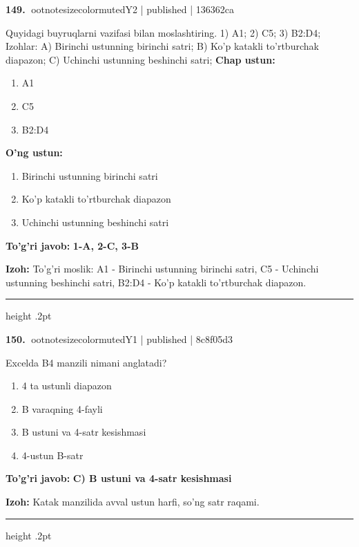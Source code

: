 \documentclass[10pt,a4paper]{article}
\begin{document}
\textbf{\color{ink}149.} {ootnotesizecolor{muted}Y2 | published | 136362ca}
\par
Quyidagi buyruqlarni vazifasi bilan moslashtiring.  1) A1;  2) C5;  3) B2:D4;  Izohlar: A) Birinchi ustunning birinchi satri;  B) Ko'p katakli to'rtburchak diapazon;  C) Uchinchi ustunning beshinchi satri;
\textbf{Chap ustun:}\begin{enumerate}[label=\arabic*),leftmargin=9mm]
\item A1
\item C5
\item B2:D4
\end{enumerate}
\textbf{O'ng ustun:}\begin{enumerate}[label=\Alph*),leftmargin=9mm]
\item Birinchi ustunning birinchi satri
\item Ko'p katakli to'rtburchak diapazon
\item Uchinchi ustunning beshinchi satri
\end{enumerate}
\begin{tcolorbox}[enhanced,breakable,colback=teal!4,colframe=teal!55!black,boxrule=0.45pt,arc=1.2mm,left=2.8mm,right=2.8mm,top=2mm,bottom=2mm]
\textbf{\color{teal}To'g'ri javob:} \textbf{1-A, 2-C, 3-B}
\par\smallskip
\textbf{Izoh:} To'g'ri moslik: A1 - Birinchi ustunning birinchi satri, C5 - Uchinchi ustunning beshinchi satri, B2:D4 - Ko'p katakli to'rtburchak diapazon.
\end{tcolorbox}
\vspace{2mm}\hrule height .2pt\vspace{2mm}

\textbf{\color{ink}150.} {ootnotesizecolor{muted}Y1 | published | 8c8f05d3}
\par
Excelda B4 manzili nimani anglatadi?
\begin{enumerate}[label=\Alph*),leftmargin=9mm]
\item 4 ta ustunli diapazon
\item B varaqning 4-fayli
\item B ustuni va 4-satr kesishmasi
\item 4-ustun B-satr
\end{enumerate}
\begin{tcolorbox}[enhanced,breakable,colback=teal!4,colframe=teal!55!black,boxrule=0.45pt,arc=1.2mm,left=2.8mm,right=2.8mm,top=2mm,bottom=2mm]
\textbf{\color{teal}To'g'ri javob:} \textbf{C) B ustuni va 4-satr kesishmasi}
\par\smallskip
\textbf{Izoh:} Katak manzilida avval ustun harfi, so'ng satr raqami.
\end{tcolorbox}
\vspace{2mm}\hrule height .2pt\vspace{2mm}
\end{document}
